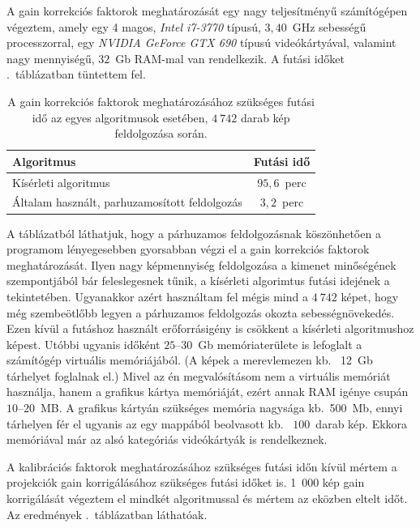 \documentclass[a4paper,12pt]{article}
\begin{document}
A gain korrekciós faktorok meghatározását egy nagy teljesítményű számítógépen végeztem, amely egy 4 magos, \emph{Intel i7-3770} típusú, $3,\!40$~GHz sebességű processzorral, egy  \emph{NVIDIA GeForce GTX 690} típusú videókártyával, valamint nagy mennyiségű, $32$~Gb RAM-mal van rendelkezik. A futási időket .~táblázatban tüntettem fel. 


\begin{table}[htbp]
\centering
\begin{tabular}{|l|c|}\hline
Algoritmus                                                 & Futási idő               \\ \hline
Kísérleti algoritmus                                       & {$95,\!6$~perc}  \\ \hline
Általam használt, parhuzamosított feldolgozás              & {$3,\!2$~perc} \\ \hline
\end{tabular}
\caption{\label{gainfutas}
A gain korrekciós faktorok meghatározásához szükséges futási idő az egyes algoritmusok esetében, $4~742$ darab kép feldolgozása során.}
\end{table}

A táblázatból láthatjuk, hogy a párhuzamos feldolgozásnak köszönhetően a programom  lényegesebben gyorsabban végzi el a gain korrekciós faktorok meghatározását. Ilyen nagy képmennyiség feldolgozása a kimenet minőségének szempontjából bár feleslegesnek tűnik, a kísérleti algorimtus futási idejének a tekintetében. Ugyanakkor azért használtam fel mégis mind a $4~742$ képet, hogy még szembeötlőbb legyen a párhuzamos feldolgozás okozta sebességnövekedés. Ezen kívül a futáshoz használt erőforrásigény is csökkent a kísérleti algoritmushoz képest. Utóbbi ugyanis időként $25$--$30$~Gb memóriaterülete is lefoglalt a számítógép virtuális memóriájából. (A képek a merevlemezen kb.~ 12~Gb tárhelyet foglalnak el.) Mivel az én megvalósításom nem a virtuális memóriát használja, hanem a grafikus kártya memóriáját, ezért annak RAM igénye csupán $10$--$20$~MB. A grafikus kártyán szükséges memória nagysága kb.\ 500~Mb, ennyi tárhelyen fér el ugyanis az egy mappából beolvasott kb.~ $100$~darab kép. Ekkora memóriával már az alsó kategóriás videókártyák is rendelkeznek.


A kalibrációs  faktorok meghatározásához szükséges futási időn kívül mértem a projekciók gain korrigálásához szükséges futási időket is. 1~000 kép gain korrigálását végeztem el mindkét algoritmussal és mértem az eközben eltelt időt. Az eredmények .~táblázatban láthatóak. 
\end{document}
